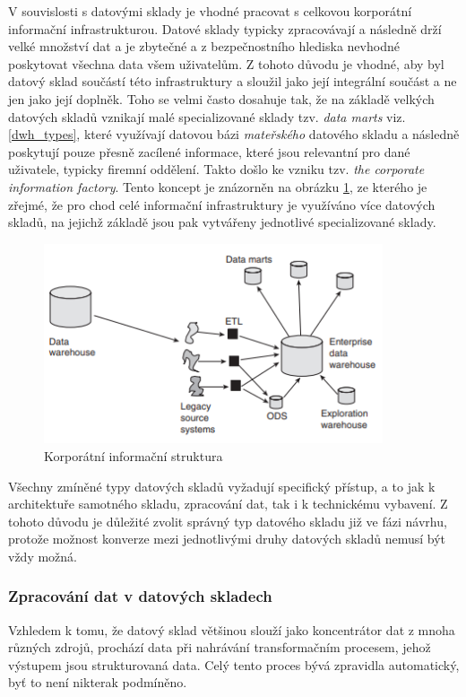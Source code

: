 \documentclass[
  digital,     %
  twoside,     %
  lof,         %
  lot,         %
]{fithesis4}
\begin{document}
V souvislosti s datovými sklady je vhodné pracovat s celkovou korporátní informační infrastrukturou. Datové sklady typicky zpracovávají a následně drží velké množství dat a je zbytečné a z bezpečnostního hlediska nevhodné poskytovat všechna data všem uživatelům. Z tohoto důvodu je vhodné, aby byl datový sklad součástí této infrastruktury a sloužil jako její integrální součást a ne jen jako její doplněk. Toho se velmi často dosahuje tak, že na základě velkých datových skladů vznikají malé specializované sklady tzv. \emph{data marts} viz. \ref{dwh_types}, které využívají datovou bázi \emph{mateřského} datového skladu a následně poskytují pouze přesně zacílené informace, které jsou relevantní pro dané uživatele, typicky firemní oddělení. Takto došlo ke vzniku tzv. \emph{the corporate information factory}.\parencite{Inmon2021} Tento koncept je znázorněn na obrázku \ref{fig:data_marts_schema}, ze kterého je zřejmé, že pro chod celé informační infrastruktury je využíváno více datových skladů, na jejichž základě jsou pak vytvářeny jednotlivé specializované sklady.

\begin{figure}[h]
  \begin{center}
          \includegraphics[width=10cm]{img/data_marts_schema.png}
  \end{center}
  \caption{Korporátní informační struktura \parencite[s.12]{Inmon2008}}
  \label{fig:data_marts_schema}
\end{figure}  

Všechny zmíněné typy datových skladů vyžadují specifický přístup, a to jak
k architektuře samotného skladu, zpracování dat, tak i k technickému vybavení. Z tohoto
důvodu je důležité zvolit správný typ datového skladu již ve fázi návrhu, protože
možnost konverze mezi jednotlivými druhy datových skladů nemusí být vždy možná.

\subsubsection{Zpracování dat v datových skladech}
Vzhledem k tomu, že datový sklad většinou slouží jako koncentrátor dat z mnoha různých zdrojů, prochází data při nahrávání transformačním procesem, jehož výstupem jsou strukturovaná data. Celý tento proces bývá zpravidla automatický, byť to není nikterak podmíněno.
\end{document}
